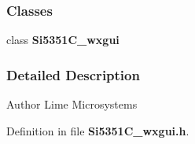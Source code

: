 \subsubsection*{Classes}
\begin{DoxyCompactItemize}
\item 
class {\bf Si5351\+C\+\_\+wxgui}
\end{DoxyCompactItemize}


\subsubsection{Detailed Description}
\begin{DoxyAuthor}{Author}
Lime Microsystems 
\end{DoxyAuthor}


Definition in file {\bf Si5351\+C\+\_\+wxgui.\+h}.

